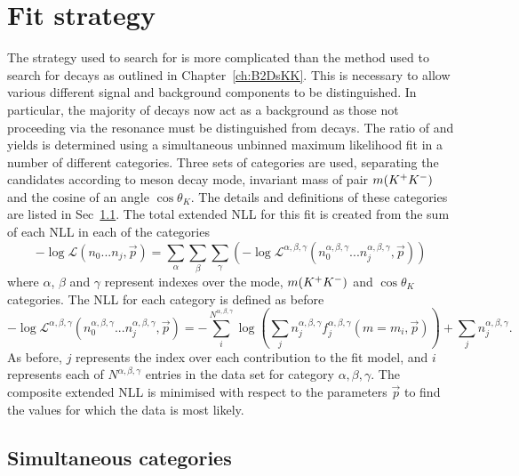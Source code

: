 \section{Fit strategy}
\label{sec:B2DsPhi_fitstrategy}
The strategy used to search for \decay{\Bp}{\Dsp\phiz} is more complicated than the method used to search for \decay{\Bp}{\Dsp\Kp\Km} decays as outlined in Chapter~\ref{ch:B2DsKK}. This is necessary to allow various different signal and background components to be distinguished. In particular, the majority of \decay{\Bp}{\Dsp\Kp\Km} decays now act as a background as those not proceeding via the \phiz resonance must be distinguished from \decay{\Bp}{\Dsp\phiz} decays. 
The ratio of \decay{\Bp}{\Dsp\phiz} and \decay{\Bp}{\Dsp\Dzb} yields is determined using a simultaneous unbinned maximum likelihood fit in a number of different categories. Three sets of categories are used, separating the candidates according to \Dsp meson decay mode, invariant mass of \Kp\Km pair $m({{K}^+}{{K}^-})$ and the cosine of an angle $\cos\theta_{K}$. The details and definitions of these categories are listed in Sec~\ref{sec:B2DsPhi_fit_cats}. 
The total extended NLL for this fit is created from the sum of each NLL in each of the categories
\begin{equation}
-\log\mathcal{L}(n_{0}...n_{j},\vec{p}) = \sum_{\alpha} \sum_{\beta} \sum_{\gamma} \left(-\log\mathcal{L^{\alpha,\beta,\gamma}}(n_{0}^{\alpha,\beta,\gamma}...n_{j}^{\alpha,\beta,\gamma},\vec{p}) \right)
\end{equation} 
where $\alpha$, $\beta$ and $\gamma$ represent indexes over the \Dsp mode, $m({{K}^+}{{K}^-})$ and $\cos\theta_{K}$ categories.
The NLL for each category is defined as before
\begin{equation}
-\log\mathcal{L^{\alpha,\beta,\gamma}}(n_{0}^{\alpha,\beta,\gamma}...n_{j}^{\alpha,\beta,\gamma},\vec{p}) = -\sum_{i}^{N^{\alpha,\beta,\gamma}} \log \left( \sum_{j} n_{j}^{\alpha,\beta,\gamma} f_{j}^{\alpha,\beta,\gamma}(m=m_{i},\vec{p}) \right) + \sum_{j}n_{j}^{\alpha,\beta,\gamma}.
\end{equation} 
As before, $j$ represents the index over each contribution to the fit model, and $i$ represents each of $N^{\alpha,\beta,\gamma}$ entries in the data set for category $\alpha,\beta,\gamma$. 
The composite extended NLL is minimised with respect to the parameters $\vec{p}$ to find the values for which the data is most likely.


\subsection{Simultaneous categories}
\label{sec:B2DsPhi_fit_cats}

